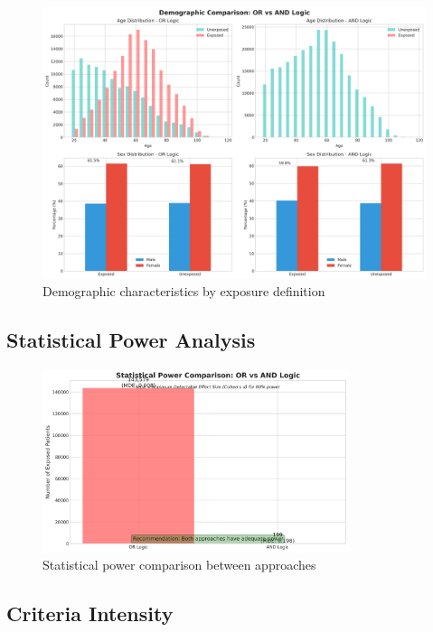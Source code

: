 \documentclass[11pt]{article}
\begin{document}
\begin{figure}[H]
\centering
\includegraphics[width=\textwidth]{demographic_comparison.png}
\caption{Demographic characteristics by exposure definition}
\end{figure}

\subsection{Statistical Power Analysis}

\begin{figure}[H]
\centering
\includegraphics[width=0.8\textwidth]{power_analysis_comparison.png}
\caption{Statistical power comparison between approaches}
\end{figure}



\subsection{Criteria Intensity}
\end{document}
